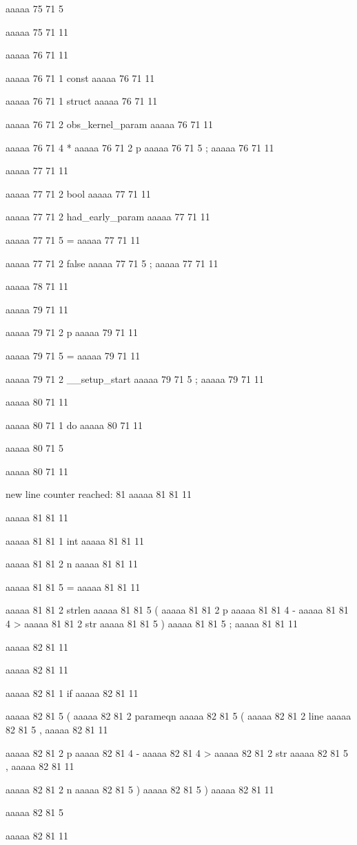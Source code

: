 aaaaa 75 71
5
{
aaaaa 75 71
11


aaaaa 76 71
11
	
aaaaa 76 71
1
const
aaaaa 76 71
11
 
aaaaa 76 71
1
struct
aaaaa 76 71
11
 
aaaaa 76 71
2
obs_kernel_param
aaaaa 76 71
11
 
aaaaa 76 71
4
*
aaaaa 76 71
2
p
aaaaa 76 71
5
;
aaaaa 76 71
11


aaaaa 77 71
11
	
aaaaa 77 71
2
bool
aaaaa 77 71
11
 
aaaaa 77 71
2
had_early_param
aaaaa 77 71
11
 
aaaaa 77 71
5
=
aaaaa 77 71
11
 
aaaaa 77 71
2
false
aaaaa 77 71
5
;
aaaaa 77 71
11


aaaaa 78 71
11


aaaaa 79 71
11
	
aaaaa 79 71
2
p
aaaaa 79 71
11
 
aaaaa 79 71
5
=
aaaaa 79 71
11
 
aaaaa 79 71
2
__setup_start
aaaaa 79 71
5
;
aaaaa 79 71
11


aaaaa 80 71
11
	
aaaaa 80 71
1
do
aaaaa 80 71
11
 
aaaaa 80 71
5
{
aaaaa 80 71
11


new line counter reached: 81
aaaaa 81 81
11
	
aaaaa 81 81
11
	
aaaaa 81 81
1
int
aaaaa 81 81
11
 
aaaaa 81 81
2
n
aaaaa 81 81
11
 
aaaaa 81 81
5
=
aaaaa 81 81
11
 
aaaaa 81 81
2
strlen
aaaaa 81 81
5
(
aaaaa 81 81
2
p
aaaaa 81 81
4
-
aaaaa 81 81
4
>
aaaaa 81 81
2
str
aaaaa 81 81
5
)
aaaaa 81 81
5
;
aaaaa 81 81
11


aaaaa 82 81
11
	
aaaaa 82 81
11
	
aaaaa 82 81
1
if
aaaaa 82 81
11
 
aaaaa 82 81
5
(
aaaaa 82 81
2
parameqn
aaaaa 82 81
5
(
aaaaa 82 81
2
line
aaaaa 82 81
5
,
aaaaa 82 81
11
 
aaaaa 82 81
2
p
aaaaa 82 81
4
-
aaaaa 82 81
4
>
aaaaa 82 81
2
str
aaaaa 82 81
5
,
aaaaa 82 81
11
 
aaaaa 82 81
2
n
aaaaa 82 81
5
)
aaaaa 82 81
5
)
aaaaa 82 81
11
 
aaaaa 82 81
5
{
aaaaa 82 81
11


}}}
